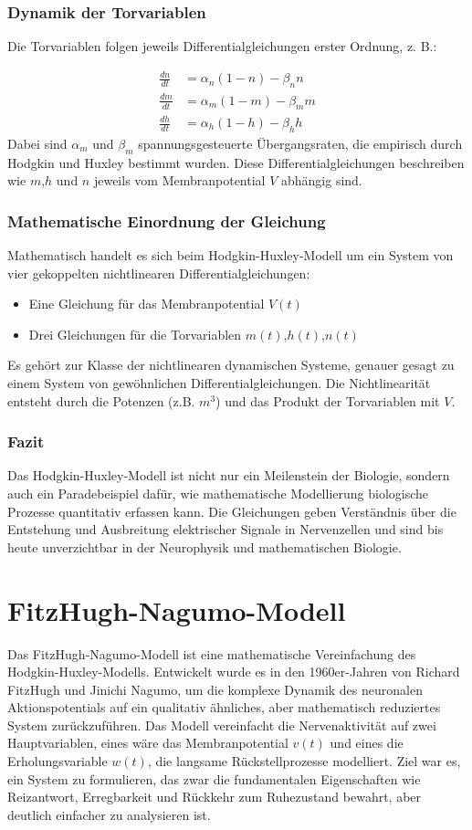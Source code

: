 \begin{refsection}
\subsubsection{Dynamik der Torvariablen}
Die Torvariablen folgen jeweils Differentialgleichungen erster Ordnung, z. B.:

\begin{align}
	\frac{dn}{dt} &= \alpha_n (1 - n) - \beta_n n \\
	\frac{dm}{dt} &= \alpha_m (1 - m) - \beta_m m \\
	\frac{dh}{dt} &= \alpha_h (1 - h) - \beta_h h 
\end{align}
\noindent
Dabei sind $\alpha_m$ und $\beta_m$ spannungsgesteuerte Übergangsraten, die empirisch durch Hodgkin und Huxley bestimmt wurden.
Diese Differentialgleichungen beschreiben wie $m$,$h$ und $n$ jeweils vom Membranpotential $V$ abhängig sind.
\subsubsection{Mathematische Einordnung der Gleichung}
Mathematisch handelt es sich beim Hodgkin-Huxley-Modell um ein System von vier gekoppelten nichtlinearen
Differentialgleichungen:
\begin{itemize}
    \item Eine Gleichung für das Membranpotential $V(t)$
    \item Drei Gleichungen für die Torvariablen $m(t)$,$h(t)$,$n(t)$
\end{itemize}
\noindent
Es gehört zur Klasse der nichtlinearen dynamischen Systeme, genauer gesagt zu einem System von gewöhnlichen Differentialgleichungen. Die Nichtlinearität entsteht durch die Potenzen (z.B. $m^3$) und das Produkt der Torvariablen mit $V$.
\subsubsection{Fazit}
Das Hodgkin-Huxley-Modell ist nicht nur ein Meilenstein der Biologie, sondern auch ein Paradebeispiel dafür, wie mathematische Modellierung biologische Prozesse quantitativ erfassen kann. Die Gleichungen geben Verständnis über die Entstehung und Ausbreitung elektrischer Signale in Nervenzellen und sind bis heute unverzichtbar in der Neurophysik und mathematischen Biologie.
\section{FitzHugh-Nagumo-Modell}
Das FitzHugh-Nagumo-Modell ist eine mathematische Vereinfachung des Hodgkin-Huxley-Modells. Entwickelt wurde es in den 1960er-Jahren von Richard FitzHugh und Jinichi Nagumo, um die komplexe Dynamik des neuronalen Aktionspotentials auf ein qualitativ ähnliches, aber mathematisch reduziertes System zurückzuführen.
Das Modell vereinfacht die Nervenaktivität auf zwei Hauptvariablen, eines wäre das Membranpotential $v(t)$ und eines die Erholungsvariable $w(t)$, die langsame Rückstellprozesse modelliert.
Ziel war es, ein System zu formulieren, das zwar die fundamentalen Eigenschaften wie Reizantwort, Erregbarkeit und Rückkehr zum Ruhezustand bewahrt, aber deutlich einfacher zu analysieren ist. 

\end{refsection}
